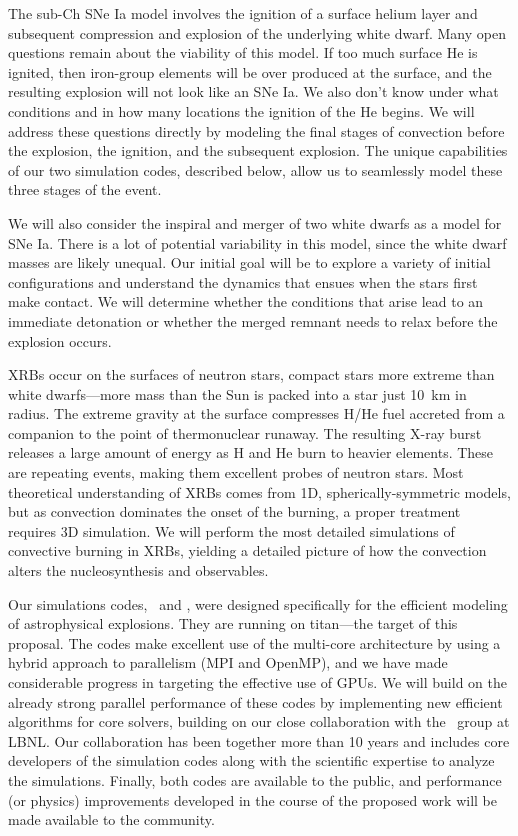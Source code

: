 \documentclass[11pt,letterpaper,english]{article}
\begin{document}
The sub-Ch SNe Ia model involves the ignition of a surface
helium layer and subsequent compression and explosion of the
underlying white dwarf.  Many open questions remain about the
viability of this model. If too much surface He is ignited,
then iron-group elements will be over produced at the surface,
and the resulting explosion will not look like an SNe Ia.  We also don't
know under what conditions and in how many locations the ignition of the
He begins. We will address these questions directly by modeling the
final stages of convection before the explosion, the ignition, and the 
subsequent explosion. The unique capabilities of our two simulation codes,
described below, allow us to seamlessly model these
three stages of the event.

We will also consider the inspiral and merger of two white dwarfs
as a model for SNe Ia.  There is a lot of potential variability in this
model, since the white dwarf masses are likely unequal.  Our initial
goal will be to explore a
variety of initial configurations and understand the dynamics that
ensues when the stars first make contact.
We will determine whether the conditions that arise lead to an immediate
detonation or whether the merged remnant needs to relax before the
explosion occurs.

XRBs occur on the surfaces of neutron stars, compact
stars more extreme than white dwarfs---more mass than
the Sun is packed into a star just 10~km in radius.  The extreme
gravity at the surface compresses H/He fuel 
accreted from a companion to the point of thermonuclear runaway.  
The resulting X-ray burst releases a large amount of energy
as H and He burn to heavier elements.
These are repeating events, making them excellent probes of 
neutron stars.  Most theoretical understanding of XRBs comes from
1D, spherically-symmetric models, but
as convection dominates the onset of the burning, a proper treatment
requires 3D simulation.  We will perform the most
detailed simulations of convective burning in XRBs, yielding a detailed
picture of how the convection alters the nucleosynthesis and observables.

Our simulations codes, \maestro\ and \castro, were designed
specifically for the efficient modeling of astrophysical explosions.
They are running on titan---the target of this proposal.
The codes make excellent use of the multi-core architecture by using 
a hybrid approach to parallelism (MPI and OpenMP), and we
have made considerable progress in targeting the effective use of GPUs. 
We will build on the already strong parallel performance of these codes
by implementing new efficient algorithms for core solvers, building on our close collaboration 
with the \boxlib\ group at
LBNL.  Our collaboration has been together more than 10 years
and includes core developers of the simulation codes along with
the scientific expertise to analyze the simulations.  
Finally, both codes are available to the public, and performance (or
physics) improvements developed in the course of the
proposed work will be made
available to the community.
\end{document}
